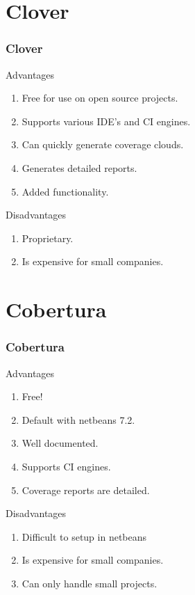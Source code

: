 \documentclass{beamer}
\begin{document}
	\section{Clover}
	\begin{frame}
	\frametitle{Clover}
    \begin{block}{Advantages}
    \begin{enumerate}
    \item<2-> Free for use on open source projects. 
    \item<3-> Supports various IDE's and CI engines.
    \item<4-> Can quickly generate coverage clouds.
    \item<5-> Generates detailed reports.
    \item<6-> Added functionality.
    \end{enumerate}
    \end{block}
    \endminipage\hfill
    \begin{block}{Disadvantages}
  \begin{enumerate}
    \item<2-> Proprietary.
    \item<3-> Is expensive for small companies.
  \end{enumerate}
  \end{block}
  \endminipage\hfill
	\end{frame}

	\section{Cobertura}
	\begin{frame}
	\frametitle{Cobertura}
	\minipage{0.45\textwidth}
    \begin{block}{Advantages}
    \begin{enumerate}
    \item<2-> Free!
    \item<2-> Default with netbeans 7.2.
    \item<3-> Well documented.
    \item<3-> Supports CI engines.
    \item<4-> Coverage reports are detailed.
    \end{enumerate}
    \end{block}
    \endminipage\hfill
    \begin{block}{Disadvantages}
  \begin{enumerate}
    \item<2-> Difficult to setup in netbeans
    \item<3-> Is expensive for small companies.
    \item<4-> Can only handle small projects.
  \end{enumerate}
  \end{block}
  \endminipage\hfill
	\end{frame}
\end{document}
